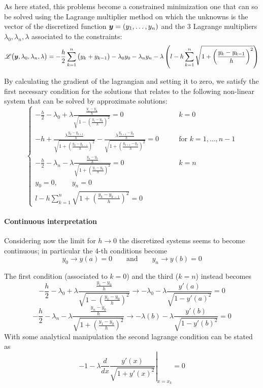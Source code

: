 	As here stated, this problems become a constrained minimization one that can so be solved using the Lagrange multiplier method on which the unknowns is the vector of the discretized function $\boldsymbol{y} = (y_1,\dots, y_n)$ and the 3 Lagrange multipliers $\lambda_0,\lambda_n,\lambda$ associated to the constraints:
	\[ \mathscr L\big(\boldsymbol{y},\lambda_0,\lambda_n,\lambda\big) = - \frac h 2 \sum_{k=1}^{n} \big(y_k + y_{k-1}\big) - \lambda_0y_0 - \lambda_ny_n - \lambda \left( l - h \sum_{k=1}^{n} \sqrt{1 + \left( \frac{y_k - y_{k-1}}{h} \right)^2} \right) \]
	
	By calculating the gradient of the lagrangian and setting it to zero, we satisfy the first necessary condition for the solutions that relates to the following non-linear system that can be solved by approximate solutions:
	\[ \begin{cases}
		- \frac{h}{2} - \lambda_0 + \lambda \frac{ \frac{y_1-y_0}{h} }{\sqrt{1- \left( \frac{y_1-y_0}{h} \right)^2}} = 0 & k = 0 \\
		-h + \frac{\lambda \frac{y_k-y_{k+1}}{h}}{\sqrt{1+\left( \frac{y_k - y_{k-1}}{h} \right)^2}} - \frac{\lambda \frac{y_{k+1}-y_{k}}{h}}{\sqrt{1+\left( \frac{y_{k+1} - y_{k}}{h} \right)^2}} = 0 \qquad& \textrm{for } k = 1,\dots,n-1 \\
		- \frac h 2 - \lambda_n - \lambda \frac{\frac{y_n - y_0}{h}}{\sqrt{1 + \left( \frac{y_1-y_0}{h} \right)^2}} = 0 & k = n \\
		y_0 = 0,\qquad y_n = 0 \\ 
		l-h\sum_{k=1}^{n} \sqrt{1 + \left( \frac{y_k - y_{k-1}}{h} \right)^2} = 0
	\end{cases} \]
	
	\paragraph{Continuous interpretation} Considering now the limit for $h\rightarrow 0$ the discretized systems seems to become continuous; in particular the 4-th conditions become
	\[ y_0 \rightarrow y(a) = 0 \qquad \textrm{and} \qquad y_n \rightarrow y(b) = 0 \]
	
	The first condition (associated to $k=0$) and the third ($k = n$) instead becomes
	\[ - \frac{h}{2} - \lambda_0 + \lambda \frac{ \frac{y_1-y_0}{h} }{\sqrt{1- \left( \frac{y_1-y_0}{h} \right)^2}} \rightarrow - \lambda_0 - \lambda \frac{y'(a)}{\sqrt{1-y'(a)^2}} = 0  \]
	\[ - \frac h 2 - \lambda_n - \lambda \frac{\frac{y_n - y_0}{h}}{\sqrt{1 + \left( \frac{y_1-y_0}{h} \right)^2}} \rightarrow  - \lambda(b) - \lambda \frac{y'(b)}{\sqrt{1-y'(b)^2}} = 0 \]
	With some analytical manipulation the second lagrange condition can be stated as
	\[ - 1 - \lambda \frac{d}{dx} \left. \frac{y'(x)}{\sqrt{1+y'(x)^2}} \right|_{x=x_k} = 0  \]
	
